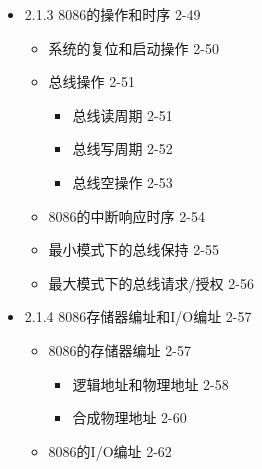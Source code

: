 \documentclass[zihao=5,linespread=1,heading=false,autoindent=0pt]{ctexart}
\newenvironment{citemize}%
{\begin{itemize}[parsep=0pt,itemsep=0pt,topsep=0pt,partopsep=0pt,labelwidth=1em,leftmargin=*]}
{\end{itemize}}
\theoremstyle{exampstyle} \newtheorem{definition}{定义}[section]
\theoremstyle{exampstyle} \newtheorem{example}{例}[section]
\theoremstyle{exampstyle} \newtheorem{theorem}{定理}[section]
\theoremstyle{exampstyle} \newtheorem{lemma}{引理}[section]
\theoremstyle{exampstyle} \newtheorem{myproof}{证明}[section]
\begin{document}
\begin{multicols*}{3}
\begin{citemize}
\begin{citemize}
\begin{citemize}
          \begin{citemize}
           
          \item
            最大工作模式特点 2-42
          \item
            引脚定义 2-42
          \item
            最大模式下的典型配置 2-46
          \item
            总线控制器8288 2-47
          \item
            总线控制器8288的连接 2-48
          \end{citemize}
        \end{citemize}
      \item
        2.1.3 8086的操作和时序 2-49
    
        \begin{citemize}
         
        \item
          系统的复位和启动操作 2-50
        \item
          总线操作 2-51
    
          \begin{citemize}
           
          \item
            总线读周期 2-51
          \item
            总线写周期 2-52
          \item
            总线空操作 2-53
          \end{citemize}
        \item
          8086的中断响应时序 2-54
        \item
          最小模式下的总线保持 2-55
        \item
          最大模式下的总线请求/授权 2-56
        \end{citemize}
      \item
        2.1.4 8086存储器编址和I/O编址 2-57
    
        \begin{citemize}
         
        \item
          8086的存储器编址 2-57
    
          \begin{citemize}
           
          \item
            逻辑地址和物理地址 2-58
          \item
            合成物理地址 2-60
          \end{citemize}
        \item
          8086的I/O编址 2-62
    

\end{citemize}
\end{citemize}
\end{citemize}
\end{multicols*}
\end{document}
